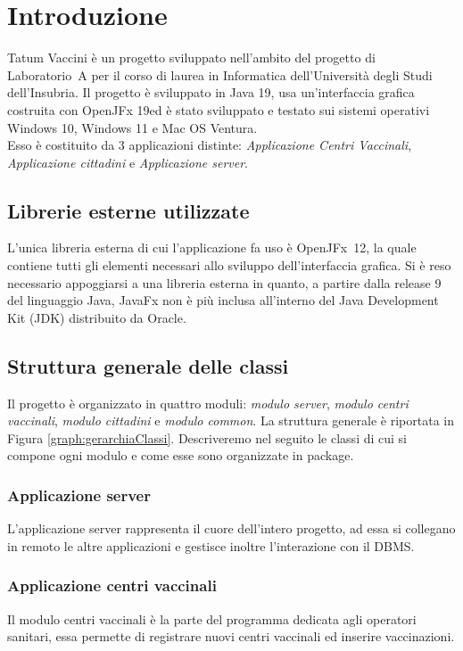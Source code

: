 \section{Introduzione}

	Tatum Vaccini è un progetto sviluppato nell'ambito del progetto di Laboratorio~A per il corso di laurea in Informatica dell'Università degli Studi dell'Insubria.
	Il progetto è sviluppato in Java 19, usa un’interfaccia grafica costruita con OpenJFx 19ed è stato sviluppato e testato sui sistemi operativi Windows 10, Windows 11 e Mac OS Ventura.\\
	Esso è costituito da 3 applicazioni distinte: \emph{Applicazione Centri Vaccinali}, \emph{Applicazione cittadini} e \emph{Applicazione server}.
	
\subsection{Librerie esterne utilizzate}
	L'unica libreria esterna di cui l'applicazione fa uso è OpenJFx~12, la quale contiene tutti gli elementi necessari allo sviluppo dell'interfaccia grafica.
	Si è reso necessario appoggiarsi a una libreria esterna in quanto, a partire dalla release 9 del linguaggio Java, JavaFx non è più inclusa all'interno del Java Development Kit (JDK) distribuito da Oracle.
	
\subsection{Struttura generale delle classi}
	Il progetto è organizzato in quattro moduli: \emph{modulo server}, \emph{modulo centri vaccinali}, \emph{modulo cittadini} e \emph{modulo common}.
	La struttura generale è riportata in Figura \ref*{graph:gerarchiaClassi}.
	Descriveremo nel seguito le classi di cui si compone ogni modulo e come esse sono organizzate in package.
	
	
	
\subsubsection*{Applicazione server}
	L'applicazione server rappresenta il cuore dell'intero progetto, ad essa si collegano in remoto le altre applicazioni e gestisce inoltre l'interazione con il DBMS.
	
	
\subsubsection*{Applicazione centri vaccinali}
	Il modulo centri vaccinali è la parte del programma dedicata agli operatori sanitari, essa permette di registrare nuovi centri vaccinali ed inserire vaccinazioni.


